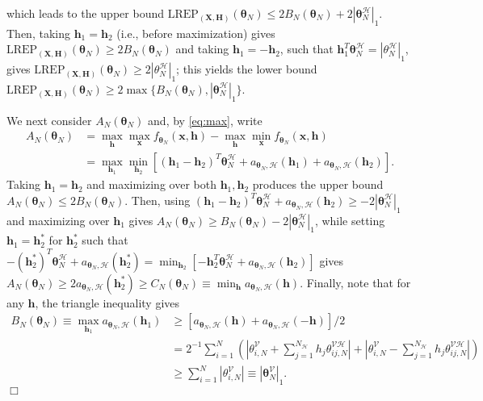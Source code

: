 \documentclass[]{article}
\theoremstyle{definition}
\newcommand{\REP}{\mathrm{LREP}}
\newcommand{\elt}{A_{N}(\boldsymbol \theta_N) }
\newcommand{\Gam}{B_{N}(\boldsymbol \theta_N) }
\newcommand{\Gamc}{C_{N}(\boldsymbol \theta_N) }
\begin{document}
which leads to the upper bound
\(\REP_{(\boldsymbol X, \boldsymbol H)}(\boldsymbol \theta_N) \leq 2 \Gam + 2 |\boldsymbol \theta_N^{\mathcal{H}} |_1\).
Then, taking \(\boldsymbol h_1=\boldsymbol h_2\) (i.e., before
maximization) gives
\(\REP_{(\boldsymbol X, \boldsymbol H)}(\boldsymbol \theta_N) \geq 2\Gam\)
and taking \(\boldsymbol h_1=-\boldsymbol h_2\), such that
\(\boldsymbol h_1^T \boldsymbol \theta_N^{\mathcal{H}} = |\theta_N^{\mathcal{H}}|_1\),
gives
\(\REP_{(\boldsymbol X, \boldsymbol H)}(\boldsymbol \theta_N) \geq 2|\theta_N^{\mathcal{H}}|_1\);
this yields the lower bound
\(\REP_{(\boldsymbol X, \boldsymbol H)}(\boldsymbol \theta_N)\geq 2\max\{\Gam, |\boldsymbol \theta_N^{\mathcal{H}} |_1\}\).

We next consider \(\elt\) and, by \eqref{eq:max}, write
\begin{align*}
\elt &=  \max_{\boldsymbol h}\max_{\boldsymbol x}f_{\boldsymbol \theta_N} (\boldsymbol x , \boldsymbol h) -  \max_{\boldsymbol h}\min_{\boldsymbol x}f_{\boldsymbol \theta_N} (\boldsymbol x , \boldsymbol h)\\
&= \max_{\boldsymbol h_1} \min_{\boldsymbol h_2 }\left[ (\boldsymbol h_1 - \boldsymbol h_2)^T \boldsymbol \theta_N^{\mathcal{H}} + a_{\boldsymbol \theta_N, \mathcal{H}} (\boldsymbol h_1)  + a_{\boldsymbol \theta_N, \mathcal{H}} (\boldsymbol h_2)\right].
\end{align*}
Taking \(\boldsymbol h_1=\boldsymbol h_2\) and maximizing over both
\(\boldsymbol h_1,\boldsymbol h_2\) produces the upper bound
\(\elt \leq 2\Gam\). Then, using
\((\boldsymbol h_1 - \boldsymbol h_2)^T \boldsymbol \theta_N^{\mathcal{H}} + a_{\boldsymbol \theta_N, \mathcal{H}} (\boldsymbol h_2) \geq - 2|\boldsymbol \theta_N^{\mathcal{H}} |_1\)
and maximizing over \(\boldsymbol h_1\) gives
\(\elt \geq \Gam- 2|\boldsymbol \theta_N^{\mathcal{H}} |_1\), while
setting \(\boldsymbol h_1=\boldsymbol h_2^*\) for \(\boldsymbol h_2^*\)
such that
\(-(\boldsymbol h_2^*) ^T \boldsymbol \theta_N^{\mathcal{H}} + a_{\boldsymbol \theta_N, \mathcal{H}} (\boldsymbol h_2^*) = \min_{\boldsymbol h_2} [-\boldsymbol h_2^T \boldsymbol \theta_N^{\mathcal{H}} + a_{\boldsymbol \theta_N, \mathcal{H}} (\boldsymbol h_2)]\)
gives
\(\elt \geq 2 a_{\boldsymbol \theta_N, \mathcal{H}} (\boldsymbol h_2^*) \geq \Gamc \equiv \min_{\boldsymbol h} a_{\boldsymbol \theta_N, \mathcal{H}} (\boldsymbol h)\).
Finally, note that for any \(\boldsymbol h\), the triangle inequality
gives
\begin{align*}
\Gam  \equiv \max_{\boldsymbol h_1}  a_{\boldsymbol \theta_N, \mathcal{H}} (\boldsymbol h_1) &\geq
[a_{\boldsymbol \theta_N, \mathcal{H}} (\boldsymbol h)  + a_{\boldsymbol \theta_N, \mathcal{H}} (-\boldsymbol h)]/2 \\
&=
2^{-1}\sum_{i=1}^{N } \left(\left| \theta_{i,N}^{\mathcal{V}}   + \sum_{j=1}^{N_{\mathcal{H}}} h_j \theta_{ij,N}^{\mathcal{VH}} \right|
+ \left| \theta_{i,N}^{\mathcal{V}}   - \sum_{j=1}^{N_{\mathcal{H}}} h_j \theta_{ij,N}^{\mathcal{VH}} \right|\right)\\
& \geq \sum_{i=1}^{N }  \left| \theta_{i,N}^{\mathcal{V}} \right| \equiv |\boldsymbol \theta_{N}^{\mathcal{V}}|_1.
\end{align*}
\hfill \(\Box\)
\end{document}
